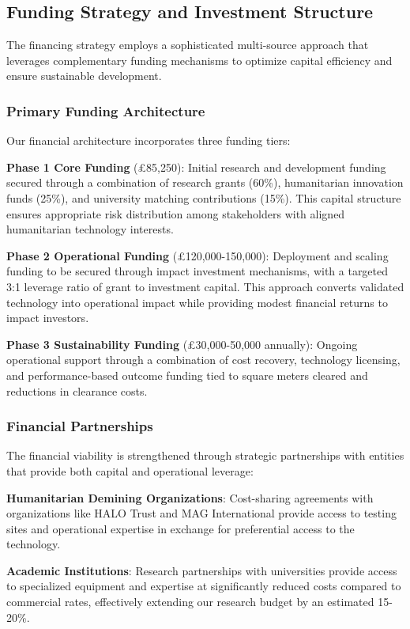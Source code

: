 \subsection{Funding Strategy and Investment Structure}
The financing strategy employs a sophisticated multi-source approach that leverages complementary funding mechanisms to optimize capital efficiency and ensure sustainable development.

\subsubsection{Primary Funding Architecture}
Our financial architecture incorporates three funding tiers:

\textbf{Phase 1 Core Funding} (\pounds 85,250): Initial research and development funding secured through a combination of research grants (60\%), humanitarian innovation funds (25\%), and university matching contributions (15\%). This capital structure ensures appropriate risk distribution among stakeholders with aligned humanitarian technology interests.

\textbf{Phase 2 Operational Funding} (\pounds 120,000-150,000): Deployment and scaling funding to be secured through impact investment mechanisms, with a targeted 3:1 leverage ratio of grant to investment capital. This approach converts validated technology into operational impact while providing modest financial returns to impact investors.

\textbf{Phase 3 Sustainability Funding} (\pounds 30,000-50,000 annually): Ongoing operational support through a combination of cost recovery, technology licensing, and performance-based outcome funding tied to square meters cleared and reductions in clearance costs.

\subsubsection{Financial Partnerships}
The financial viability is strengthened through strategic partnerships with entities that provide both capital and operational leverage:

\textbf{Humanitarian Demining Organizations}: Cost-sharing agreements with organizations like HALO Trust and MAG International provide access to testing sites and operational expertise in exchange for preferential access to the technology.

\textbf{Academic Institutions}: Research partnerships with universities provide access to specialized equipment and expertise at significantly reduced costs compared to commercial rates, effectively extending our research budget by an estimated 15-20\%.

